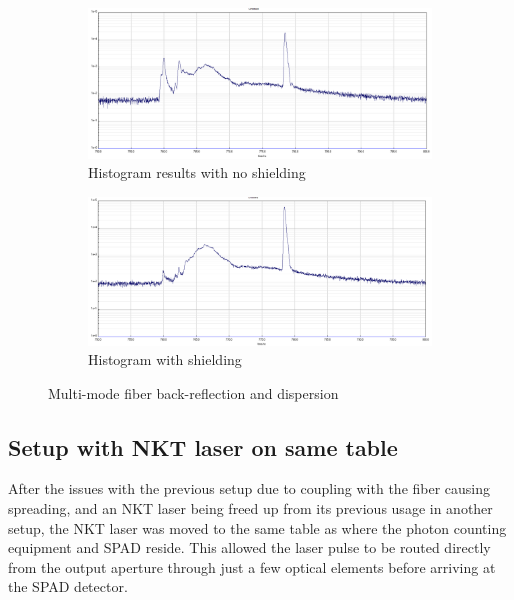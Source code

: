 \documentclass[a4paper]{article}
\begin{document}
\begin{figure}[!htb]
     \centering
     \begin{subfigure}[b]{1.0\textwidth}
         \centering
         \includegraphics[width=\textwidth]{figures/550_no_hand.PNG}
         \caption{Histogram results with no shielding}
         \label{fig:fiber_graph_no_hand}
     \end{subfigure}
     \hfill
     \begin{subfigure}[b]{1.0\textwidth}
         \centering
         \includegraphics[width=\textwidth]{figures/550-actually covered.PNG}
         \caption{Histogram with shielding}
         \label{fig:fiber_graph_hand}
     \end{subfigure}
        \caption{Multi-mode fiber  back-reflection and dispersion}
        \label{fig:fiber_graphs}
\end{figure}

\subsection{Setup with NKT laser on same table}

After the issues with the previous setup due to coupling with the fiber causing spreading, and an NKT laser being freed up from its previous usage in another setup, the NKT laser was moved to the same table as where the photon counting equipment and SPAD reside. This allowed the laser pulse to be routed directly from the output aperture through just a few optical elements before arriving at the SPAD detector.
\end{document}
